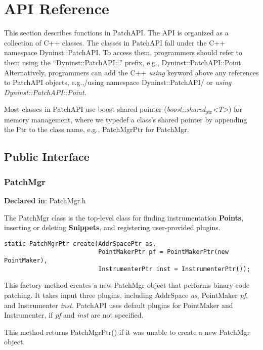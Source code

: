 \section{API Reference}
\label{sec-3}

This section describes functions in PatchAPI. The API is organized as a
collection of C++ classes. The classes in PatchAPI fall under the C++ namespace
Dyninst::PatchAPI. To access them, programmers should refer to them using the
``Dyninst::PatchAPI::'' prefix, e.g., Dyninst::PatchAPI::Point. Alternatively,
programmers can add the C++ \emph{using} keyword above any references to PatchAPI
objects, e.g.,/using namespace Dyninst::PatchAPI/ or \emph{using Dyninst::PatchAPI::Point}.

Most classes in PatchAPI use boost shared pointer (\emph{boost::shared$_{\mathrm{ptr}}$<T>}) for
memory management, where we typedef a class's shared pointer by appending the
Ptr to the class name, e.g., PatchMgrPtr for PatchMgr.

\subsection{Public Interface}
\label{sec-3.1}

\subsubsection{PatchMgr}
\label{sec-3.1.1}

\textbf{Declared in}: PatchMgr.h

The PatchMgr class is the top-level class for finding instrumentation \textbf{Points},
inserting or deleting \textbf{Snippets}, and registering user-provided plugins.


\begin{verbatim}
static PatchMgrPtr create(AddrSpacePtr as,
                          PointMakerPtr pf = PointMakerPtr(new PointMaker),
                          InstrumenterPtr inst = InstrumenterPtr());

\end{verbatim}



This factory method creates a new PatchMgr object that performs binary code
patching. It takes input three plugins, including AddrSpace \emph{as}, PointMaker
\emph{pf}, and Instrumenter \emph{inst}. PatchAPI uses default plugins for PointMaker and
Instrumenter, if \emph{pf} and \emph{inst} are not specified.

This method returns PatchMgrPtr() if it was unable to create a new PatchMgr
object.


